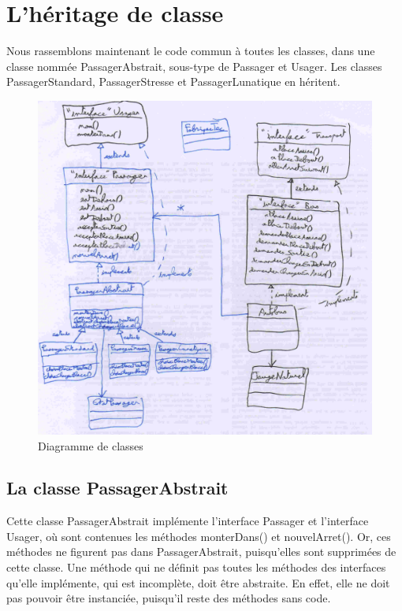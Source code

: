 \documentclass[a4paper,11pt]{article}
\begin{document}
\section{L'héritage de classe}
Nous rassemblons maintenant le code commun à toutes les classes, dans une classe nommée PassagerAbstrait, sous-type de Passager et Usager. Les classes PassagerStandard, PassagerStresse et PassagerLunatique en héritent.

\begin{figure}[!ht]
  \begin{center}
    \caption{Diagramme de classes}
    \includegraphics[scale=0.1]{diagramme.jpg}
  \end{center}
\end{figure}

\subsection{La classe PassagerAbstrait}
Cette classe PassagerAbstrait implémente l'interface Passager et l'interface Usager, où sont contenues les méthodes monterDans() et nouvelArret(). Or, ces méthodes ne figurent pas dans PassagerAbstrait, puisqu'elles sont supprimées de cette classe. Une méthode qui ne définit pas toutes les méthodes des interfaces qu'elle implémente, qui est incomplète, doit être abstraite. En effet, elle ne doit pas pouvoir être instanciée, puisqu'il reste des méthodes sans code.
\end{document}

